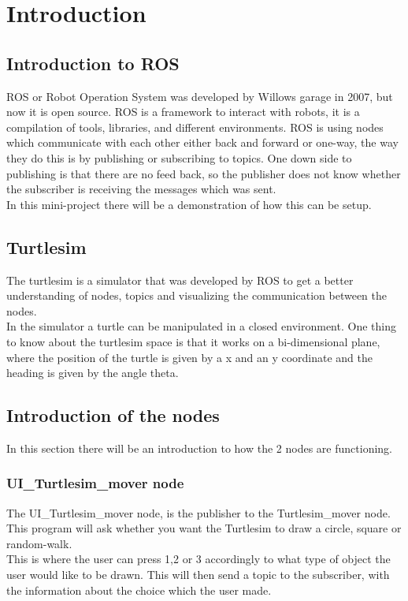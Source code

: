 \chapter{Introduction}

\section{Introduction to ROS}
ROS or Robot Operation System was developed by Willows garage in 2007, but now it is open source. ROS is a framework to interact with robots, it is a compilation of tools, libraries, and different environments\cite{ROSINTRO}. ROS is using nodes which communicate with each other either back and forward or one-way, the way they do this is by publishing or subscribing to topics. One down side to publishing is that there are no feed back, so the publisher does not know whether the subscriber is receiving the messages which was sent.\\
In this mini-project there will be a demonstration of how this can be setup.

\section{Turtlesim}

The turtlesim is a simulator that was developed by ROS to get a better understanding of nodes, topics and visualizing the communication between the nodes.\\
In the simulator a turtle can be manipulated in a closed environment. One thing to know about the turtlesim space is that it works on a bi-dimensional plane, where the position of the turtle is given by a x and an y coordinate and the heading is given by the angle theta.

\section{Introduction of the nodes}\label{ch:introduction}


In this section there will be an introduction to how the 2 nodes are functioning. 

\subsection{UI\_Turtlesim\_mover node}

The UI\_Turtlesim\_mover node, is the publisher to the Turtlesim\_mover node.\\
This program will ask whether you want the Turtlesim to draw a circle, square or random-walk.\\
This is where the user can press 1,2 or 3 accordingly to what type of object the user would like to be drawn. This will then send a topic to the subscriber, with the information about the choice which the user made.\\


